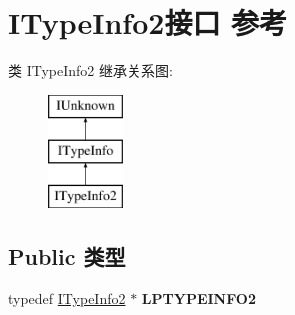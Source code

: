\hypertarget{interface_i_type_info2}{}\section{I\+Type\+Info2接口 参考}
\label{interface_i_type_info2}
类 I\+Type\+Info2 继承关系图\+:\begin{figure}[H]
\begin{center}
\leavevmode
\includegraphics[height=3.000000cm]{interface_i_type_info2}
\end{center}
\end{figure}
\subsection*{Public 类型}
\begin{DoxyCompactItemize}
\item 
\mbox{\label{interface_i_type_info2_a21c58d06546f6c4120cb6f6838f63de7}} 
typedef \hyperlink{interface_i_type_info2}{I\+Type\+Info2} $\ast$ {\bfseries L\+P\+T\+Y\+P\+E\+I\+N\+F\+O2}
\end{DoxyCompactItemize}
